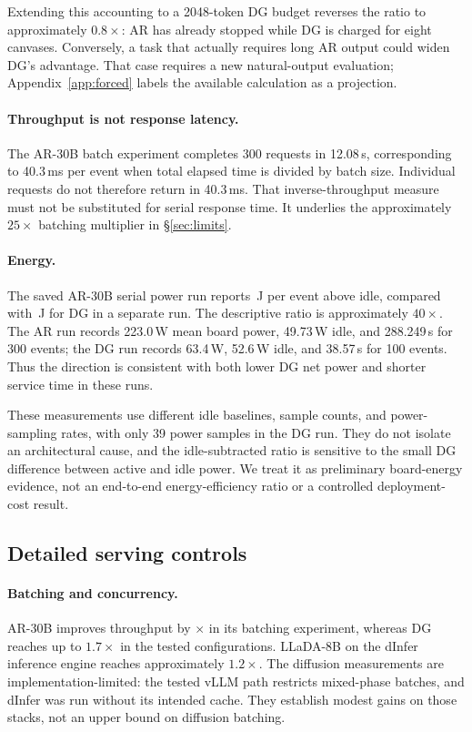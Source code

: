 Extending this accounting to a 2048-token DG budget reverses the
ratio to approximately $0.8\times$: AR has already stopped while DG
is charged for eight canvases. Conversely, a task that actually requires
long AR output could widen DG's advantage. That case requires a new
natural-output evaluation; Appendix~\ref{app:forced} labels the
available calculation as a projection.

\paragraph{Throughput is not response latency.}
The AR-30B batch experiment completes 300 requests in 12.08\,s,
corresponding to 40.3\,ms per event when total elapsed time is divided
by batch size. Individual requests do not therefore return in 40.3\,ms.
That inverse-throughput measure must not be substituted for serial
response time. It underlies the approximately $25\times$ batching
multiplier in \S\ref{sec:limits}.

\paragraph{Energy.}
The saved AR-30B serial power run reports \arEnergy\,J per event
above idle, compared with \dgEnergy\,J for DG in a separate run.
The descriptive ratio is approximately $40\times$. The AR run records
223.0\,W mean board power, 49.73\,W idle, and 288.249\,s for 300
events; the DG run records 63.4\,W, 52.6\,W idle, and 38.57\,s for
100 events. Thus the direction is consistent with both lower DG net
power and shorter service time in these runs.

These measurements use different idle baselines, sample counts, and
power-sampling rates, with only 39 power samples in the DG run.
They do not isolate an architectural cause, and the idle-subtracted
ratio is sensitive to the small DG difference between active and idle
power. We treat it as preliminary board-energy evidence, not an
end-to-end energy-efficiency ratio or a controlled deployment-cost result.

\subsection{Detailed serving controls}


\paragraph{Batching and concurrency.}
AR-30B improves throughput by \arBatchMult$\times$ in its batching
experiment, whereas DG reaches up to $1.7\times$ in the tested
configurations. LLaDA-8B on the dInfer inference engine reaches approximately $1.2\times$.
The diffusion measurements are implementation-limited: the tested vLLM
path restricts mixed-phase batches, and dInfer was run without its
intended cache. They establish modest gains on those stacks, not an
upper bound on diffusion batching.

